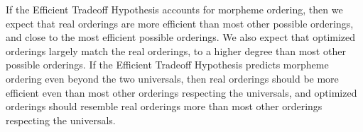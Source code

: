 \documentclass[11pt,letterpaper]{article}
\newcommand\becky[1]{{\color{blue}(#1)}}
\newcommand{\jd}[1]{\textcolor{Pink}{[jd: #1]}}
\begin{document}

If the Efficient Tradeoff Hypothesis accounts for morpheme ordering, then we expect that real orderings are more efficient than most other possible orderings, and close to the most efficient possible orderings.
We also expect that optimized orderings largely match the real orderings, to a higher degree than most other possible orderings.
If the Efficient Tradeoff Hypothesis predicts morpheme ordering even beyond the two universals, then real orderings should be more efficient even than most other orderings respecting the universals, and optimized orderings should resemble real orderings more than most other orderings respecting the universals.

\end{document}
